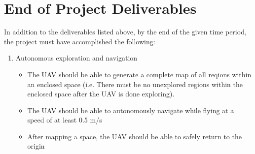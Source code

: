 \documentclass[english]{upeeei}
\begin{document}
\section{End of Project Deliverables}
In addition to the deliverables listed above, by the end of the given time period, the project must have accomplished
the following:
\begin{enumerate}
    \item Autonomous exploration and navigation
    \begin{itemize}
        \item The UAV should be able to generate a complete map of all reqions within an enclosed space (i.e. There must be
        no unexplored regions within the enclosed space after the UAV is done exploring).
        \item The UAV should be able to autonomously navigate while flying at a speed of at least 0.5 m/s
        \item After mapping a space, the UAV should be able to safely return to the origin
    \end{itemize}
\end{enumerate}
\printbibliography[
heading=bibintoc,
title={Bibliography}
]
\end{document}
